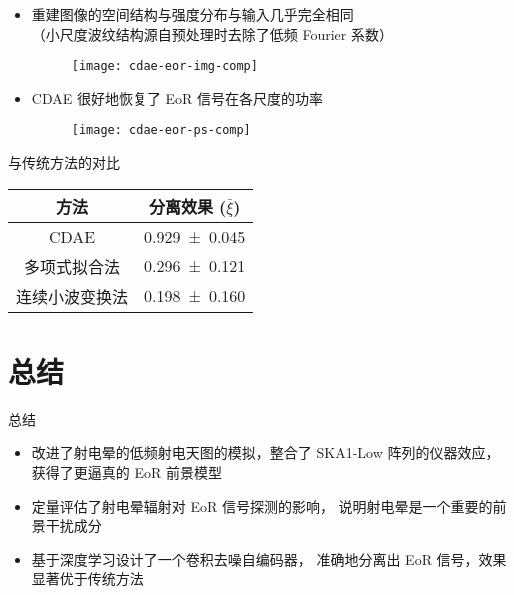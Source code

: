 \documentclass{beamer}
\begin{document}
\begin{frame}
  \vspace{1ex}
  \begin{itemize}
    \item 重建图像的空间结构与强度分布与输入几乎完全相同 \\
      （小尺度波纹结构源自预处理时去除了低频 Fourier 系数）
      \begin{figure}
      \centering
      \texttt{[image: cdae-eor-img-comp]}
      \end{figure}
    \item CDAE 很好地恢复了 EoR 信号在各尺度的功率
      \begin{figure}
      \centering
      \texttt{[image: cdae-eor-ps-comp]}
      \end{figure}
  \end{itemize}
\end{frame}

\begin{frame}[t]
  \begin{alertblock}{与传统方法的对比}
  \end{alertblock}
  \begin{table}
    \centering
    \begin{tabular}{cc}
      \toprule
      方法 & 分离效果 ($\bar{\xi}$) \\
      \midrule
      CDAE & \num{0.929 +- 0.045} \\
      \midrule
      多项式拟合法 & \num{0.296 +- 0.121} \\
      连续小波变换法 & \num{0.198 +- 0.160} \\
      \bottomrule
    \end{tabular}
  \end{table}
\end{frame}


\section{总结}

\begin{frame}{总\cspace{}结}
  \begin{itemize}
    \item 改进了射电晕的低频射电天图的模拟，整合了 SKA1-Low 阵列的仪器效应，
      获得了更逼真的 EoR 前景模型
    \item 定量评估了射电晕辐射对 EoR 信号探测的影响，
      说明射电晕是一个重要的前景干扰成分
    \item 基于深度学习设计了一个卷积去噪自编码器，
      准确地分离出 EoR 信号，效果显著优于传统方法
  \end{itemize}
\end{frame}
\end{document}
